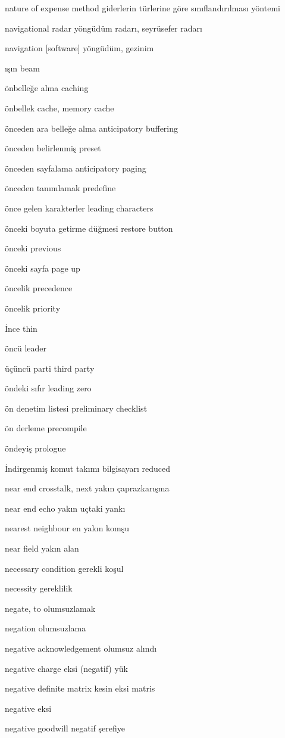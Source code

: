 \documentclass[12pt,fleqn]{article}\usepackage{../../common}
\begin{document}
nature of expense method giderlerin türlerine göre sınıflandırılması yöntemi

navigational radar yöngüdüm radarı, seyrüsefer radarı

navigation [software] yöngüdüm, gezinim

ışın beam

önbelleğe alma caching

önbellek cache, memory cache

önceden ara belleğe alma anticipatory buffering

önceden belirlenmiş preset

önceden sayfalama anticipatory paging

önceden tanımlamak predefine

önce gelen karakterler leading characters

önceki boyuta getirme düğmesi restore button

önceki previous

önceki sayfa page up

öncelik precedence

öncelik priority

İnce thin

öncü leader

üçüncü parti third party

öndeki sıfır leading zero

ön denetim listesi preliminary checklist

ön derleme precompile

öndeyiş prologue

İndirgenmiş komut takımı bilgisayarı reduced

near end crosstalk, next yakın çaprazkarışma

near end echo yakın uçtaki yankı

nearest neighbour en yakın komşu

near field yakın alan

necessary condition gerekli koşul

necessity gereklilik

negate, to olumsuzlamak

negation olumsuzlama

negative acknowledgement olumsuz alındı

negative charge eksi (negatif) yük

negative definite matrix kesin eksi matris

negative eksi

negative goodwill negatif şerefiye
\end{document}

